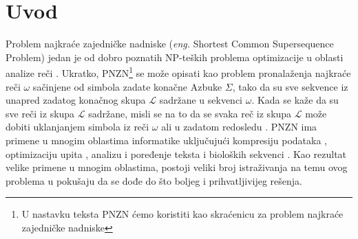 \documentclass[12pt,oneside]{memoir}
\begin{document}
\frontmatter
\naslovna
\komisija
\apstrakt
\tableofcontents*

\mainmatter

\chapter{Uvod}
Problem najkraće zajedničke nadniske (\textit{eng.} Shortest Common Supersequence Problem)
jedan je od dobro poznatih NP-teških problema optimizacije u oblasti analize reči \cite{ProbabilisticBS}.
Ukratko, PNZN\footnote{U nastavku teksta PNZN ćemo koristiti kao skraćenicu za problem najkraće zajedničke nadniske}
se može opisati kao problem pronalaženja najkraće reči $\omega$ sačinjene
od simbola zadate konačne Azbuke $\Sigma$, tako da su sve sekvence iz unapred zadatog konačnog skupa
$\mathcal{L}$ sadržane u sekvenci $\omega$. Kada se kaže da su sve reči iz skupa $\mathcal{L}$
sadržane, misli se na to da se svaka reč iz skupa $\mathcal{L}$ može dobiti uklanjanjem simbola iz reči $\omega$ ali 
u zadatom redosledu \cite{SCSSProblemDef}. PNZN ima primene u mnogim oblastima informatike uključujući kompresiju podataka
\cite{DataCompression}, optimizaciju upita \cite{MQOptimization}, analizu i poređenje teksta i bioloških sekvenci \cite{ITAlgorithms} \cite{SeqComparison}.
Kao rezultat velike primene u mnogim oblastima, postoji veliki broj istraživanja na temu ovog problema u pokušaju da se dođe
do što boljeg i prihvatljivijeg rešenja.
\end{document}
